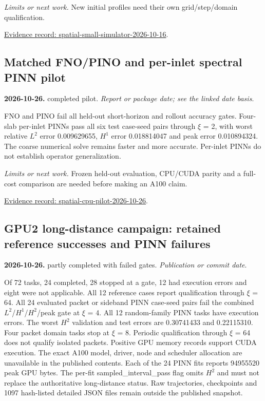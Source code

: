 \documentclass[11pt]{article}
\begin{document}
\noindent\textit{Limits or next work.} New initial profiles need their own grid/step/domain qualification.

\noindent\href{https://github.com/matasvai/dysthe-paper/blob/codex/research-record-2026-11-05/research-record/2026-11-05/README.md#spatial-small-simulator-2026-10-16}{Evidence record: spatial-small-simulator-2026-10-16}.
\subsection*{Matched FNO/PINO and per-inlet spectral PINN pilot}
\noindent\textbf{2026-10-26.} completed pilot. \emph{Report or package date; see the linked date basis}.\par
FNO and PINO fail all held-out short-horizon and rollout accuracy gates. Four-slab per-inlet PINNs pass all six test case-seed pairs through $\xi$ = 2, with worst relative $L^2$ error 0.009629655, $H^1$ error 0.018814047 and peak error 0.010894324. The coarse numerical solve remains faster and more accurate. Per-inlet PINNs do not establish operator generalization.

\noindent\textit{Limits or next work.} Frozen held-out evaluation, CPU/CUDA parity and a full-cost comparison are needed before making an A100 claim.

\noindent\href{https://github.com/matasvai/dysthe-paper/blob/codex/research-record-2026-11-05/research-record/2026-11-05/README.md#spatial-cpu-pilot-2026-10-26}{Evidence record: spatial-cpu-pilot-2026-10-26}.
\subsection*{GPU2 long-distance campaign: retained reference successes and PINN failures}
\noindent\textbf{2026-10-26.} partly completed with failed gates. \emph{Publication or commit date}.\par
Of 72 tasks, 24 completed, 28 stopped at a gate, 12 had execution errors and eight were not applicable. All 12 reference cases report qualification through $\xi$ = 64. All 24 evaluated packet or sideband PINN case-seed pairs fail the combined $L^2$/$H^1$/$H^2$/peak gate at $\xi$ = 4. All 12 random-family PINN tasks have execution errors. The worst $H^2$ validation and test errors are 0.30741433 and 0.22115310. Four packet domain tasks stop at $\xi$ = 8. Periodic qualification through $\xi$ = 64 does not qualify isolated packets. Positive GPU memory records support CUDA execution. The exact A100 model, driver, node and scheduler allocation are unavailable in the published contents. Each of the 24 PINN fits reports 94955520 peak GPU bytes. The per-fit sampled\_interval\_pass flag omits $H^2$ and must not replace the authoritative long-distance status. Raw trajectories, checkpoints and 1097 hash-listed detailed JSON files remain outside the published snapshot.
\end{document}
